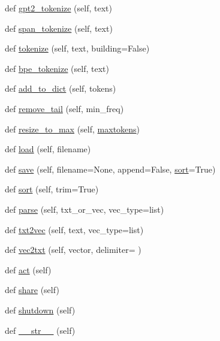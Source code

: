 \begin{DoxyCompactItemize}
def \hyperlink{classparlai_1_1core_1_1dict_1_1DictionaryAgent_a57685af2fcd0a684b7102c55afe0c8ad}{gpt2\+\_\+tokenize} (self, text)
\item 
def \hyperlink{classparlai_1_1core_1_1dict_1_1DictionaryAgent_a8fede3cf83af6a47c5dd4bb356de3350}{span\+\_\+tokenize} (self, text)
\item 
def \hyperlink{classparlai_1_1core_1_1dict_1_1DictionaryAgent_aca7e5edfd6502701277cb83b75ff4e96}{tokenize} (self, text, building=False)
\item 
def \hyperlink{classparlai_1_1core_1_1dict_1_1DictionaryAgent_a520e4bc630cd60f075ad21632ef677a1}{bpe\+\_\+tokenize} (self, text)
\item 
def \hyperlink{classparlai_1_1core_1_1dict_1_1DictionaryAgent_acb28700c8c2725c05a8f3e28f11f8714}{add\+\_\+to\+\_\+dict} (self, tokens)
\item 
def \hyperlink{classparlai_1_1core_1_1dict_1_1DictionaryAgent_ae828063449b45112d82a97921d35c247}{remove\+\_\+tail} (self, min\+\_\+freq)
\item 
def \hyperlink{classparlai_1_1core_1_1dict_1_1DictionaryAgent_a1a800c1aecdb97986c59fd26f1b55626}{resize\+\_\+to\+\_\+max} (self, \hyperlink{classparlai_1_1core_1_1dict_1_1DictionaryAgent_abeece13fbdc77b7479d4fb5d02858816}{maxtokens})
\item 
def \hyperlink{classparlai_1_1core_1_1dict_1_1DictionaryAgent_aa4229d1ba17932f588e15067afd9bf42}{load} (self, filename)
\item 
def \hyperlink{classparlai_1_1core_1_1dict_1_1DictionaryAgent_a0c6a8d8b67fe978549b328e7b7b07450}{save} (self, filename=None, append=False, \hyperlink{classparlai_1_1core_1_1dict_1_1DictionaryAgent_a84cb4fabf5d0e92e3f80ac16bdfd0ccc}{sort}=True)
\item 
def \hyperlink{classparlai_1_1core_1_1dict_1_1DictionaryAgent_a84cb4fabf5d0e92e3f80ac16bdfd0ccc}{sort} (self, trim=True)
\item 
def \hyperlink{classparlai_1_1core_1_1dict_1_1DictionaryAgent_ad34c4135329f6768d22d519c3c483d68}{parse} (self, txt\+\_\+or\+\_\+vec, vec\+\_\+type=list)
\item 
def \hyperlink{classparlai_1_1core_1_1dict_1_1DictionaryAgent_abc3baf742422fc7cdaece698224709d4}{txt2vec} (self, text, vec\+\_\+type=list)
\item 
def \hyperlink{classparlai_1_1core_1_1dict_1_1DictionaryAgent_af2eeb50b2cd6cf3a8ca817b729ec7486}{vec2txt} (self, vector, delimiter=\textquotesingle{} \textquotesingle{})
\item 
def \hyperlink{classparlai_1_1core_1_1dict_1_1DictionaryAgent_af34b92857b41748aafdecee34ebf9345}{act} (self)
\item 
def \hyperlink{classparlai_1_1core_1_1dict_1_1DictionaryAgent_a3d8996e367685451f7de85e8284243d7}{share} (self)
\item 
def \hyperlink{classparlai_1_1core_1_1dict_1_1DictionaryAgent_aea9aca40dd1bb1976f4042565b172d88}{shutdown} (self)
\item 
def \hyperlink{classparlai_1_1core_1_1dict_1_1DictionaryAgent_a4b822841903bedb2b0f866e7bd17f3fa}{\+\_\+\+\_\+str\+\_\+\+\_\+} (self)
\end{DoxyCompactItemize}

